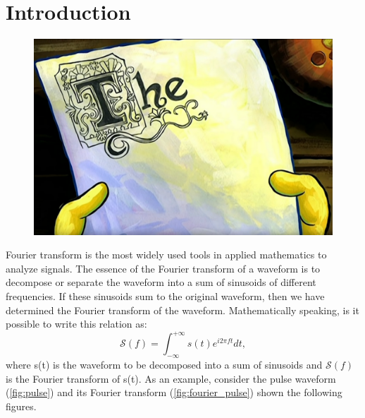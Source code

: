 \documentclass[a4paper,12pt]{article}
\begin{document}
\section*{Introduction}

\begin{figure} %
    \vspace{-15pt}
    \includegraphics[width=\linewidth]{THE.png}
    \vspace{-48pt}
\end{figure}
Fourier transform is the most widely used tools in applied mathematics
to analyze signals. The essence of the Fourier transform of a waveform is to decompose
or separate the waveform into a sum of sinusoids of different frequencies.
If these sinusoids sum to the original waveform, then we have determined
the Fourier transform of the waveform.
Mathematically speaking, is it possible to write this relation as:
$$
\mathcal{S}(f) = \int_{-\infty}^{+\infty} s(t) e^{i2\pi f t} dt,
$$
where s(t) is the waveform to be decomposed into a sum of sinusoids
and $\mathcal{S}(f)$ is the Fourier transform of s(t).
As an example, consider the
pulse waveform (\ref{fig:pulse}) and its Fourier transform (\ref{fig:fourier_pulse}) shown the following figures.
\end{document}
